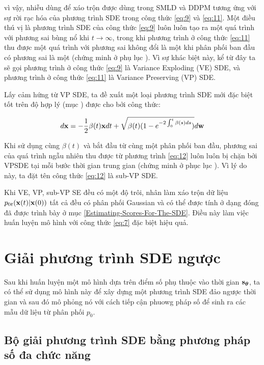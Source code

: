 \documentclass{article} %
\begin{document}
vì vậy, nhiễu dùng để xáo trộn được dùng trong SMLD và DDPM tương ứng với sự rời rạc hóa của phương trình SDE trong công thức \ref{eq:9} và \ref{eq:11}.
Một điều thú vị là phương trình SDE của công thức \ref{eq:9} luôn luôn tạo ra một quá trình với phương sai bùng nổ khi $t \rightarrow \infty$, trong khi phương trình ở công thức \ref{eq:11} thu được một quá trình với phương sai không đổi là một khi phân phối ban đầu có phương sai là một (chứng minh ở phụ lục ).
Vì sự khác biệt này, kể từ đây ta sẽ gọi phương trình ở công thức \ref{eq:9} là Variance Exploding (VE) SDE, và phương trình ở công thức \ref{eq:11} là Variance Preserving (VP) SDE.

Lấy cảm hứng từ VP SDE, ta đề xuất một loại phương trình SDE mới đặc biệt tốt trên độ hợp lý (mục ) được cho bởi công thức:

\begin{equation} \label{eq:12}
    d \bold{x} = -\dfrac{1}{2} \beta(t) \bold{x} dt + \sqrt{\beta(t) (1-e^{-2\int_{0}^{t} \beta(s)ds} )} d \bold{w}
\end{equation}

Khi sử dụng cùng $\beta(t)$ và bắt đầu từ cùng một phân phối ban đầu, phương sai của quá trình ngẫu nhiên thu được từ phương trình \ref{eq:12} luôn luôn bị chặn bởi VPSDE tại mỗi bước thời gian trung gian (chứng minh ở phục lục ).
Vì lý do này, ta đặt tên công thức \ref{eq:12} là sub-VP SDE.

Khi VE, VP, sub-VP SE đều có một độ trôi, nhân làm xáo trộn dữ liệu $p_{0t}(\bold{x}(t) \vert \bold{x}(0))$ tất cả đều có phân phối Gaussian và có thể được tính ở dạng đóng đã được trình bày ở mục \ref{Estimating-Scores-For-The-SDE}.
Điều này làm việc huấn luyện mô hình với công thức \ref{eq:7} đặc biệt hiệu quả.

\section{Giải phương trình SDE ngược}

Sau khi huấn luyện một mô hình dựa trên điểm số phụ thuộc vào thời gian $\bold{s}_{\boldsymbol{\theta}}$, ta có thể sử dụng mô hình này để xây dựng một phương trình SDE đảo ngược thời gian và sau đó mô phỏng nó với cách tiếp cận phuowg pháp số để sinh ra các mẫu dữ liệu từ phân phối $p_0$.

\subsection{Bộ giải phương trình SDE bằng phương pháp số đa chức năng}
\end{document}

